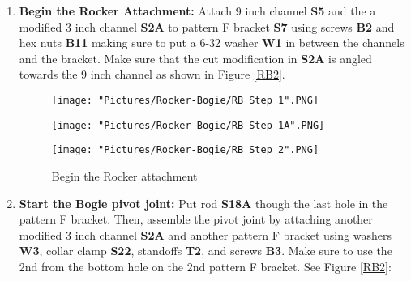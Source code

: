 \documentclass[12pt]{article}
\begin{document}
\begin{enumerate}
\item \textbf{Begin the Rocker Attachment:}  Attach 9 inch channel \textbf{S5} and the a modified 3 inch channel \textbf{S2A} to pattern F bracket \textbf{S7} using screws \textbf{B2} and hex nuts \textbf{B11} making sure to put a 6-32 washer \textbf{W1} in between the channels and the bracket. Make sure that the cut modification in \textbf{S2A} is angled towards the 9 inch channel as shown in Figure \ref {RB2}. 

\begin{figure}[H]
  	\centering
  	\begin{minipage}[b]{0.30\textwidth}
    		\texttt{[image: "Pictures/Rocker-Bogie/RB Step 1".PNG]}
  	\end{minipage}
  	\hfill
  	\begin{minipage}[b]{0.30\textwidth}
    		\texttt{[image: "Pictures/Rocker-Bogie/RB Step 1A".PNG]}
  	\end{minipage}
    	\hfill
  	\begin{minipage}[b]{0.30\textwidth}
    		\texttt{[image: "Pictures/Rocker-Bogie/RB Step 2".PNG]}
  	\end{minipage}
  	\caption{Begin the Rocker attachment}
\end{figure}



\item \textbf{Start the Bogie pivot joint:} Put rod \textbf{S18A} though the last hole in the pattern F bracket. Then,  assemble the pivot joint by attaching another modified 3 inch channel \textbf{S2A} and another pattern F bracket using washers \textbf{W3}, collar clamp \textbf{S22}, standoffs \textbf{T2}, and screws \textbf{B3}. Make sure to use the 2nd from the bottom hole on the 2nd pattern F bracket. See Figure \ref{RB2}:



\end{enumerate}
\end{document}
